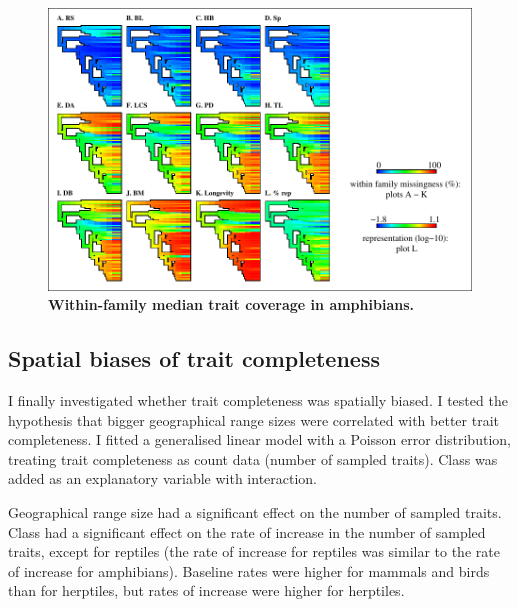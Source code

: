 \begin{figure}[h!]
\centering
\includegraphics[scale=1]{figures/chapter2/NA_phylo_patterns/Amphibians_coverage}
\caption[Within-family median trait coverage in amphibians]{\textbf{Within-family median trait coverage in amphibians.}}
\label{familycov_amphibians}
\end{figure}

\pagebreak


\subsection{Spatial biases of trait completeness} 
I finally investigated whether trait completeness was spatially biased. I tested the hypothesis that bigger geographical range sizes were correlated with better trait completeness. I fitted a generalised linear model with a Poisson error distribution, treating trait completeness as count data (number of sampled traits). Class was added as an explanatory variable with interaction. 

Geographical range size had a significant effect on the number of sampled traits. Class had a significant effect on the rate of increase in the number of sampled traits, except for reptiles (the rate of increase for reptiles was similar to the rate of increase for amphibians). Baseline rates were higher for mammals and birds than for herptiles, but rates of increase were higher for herptiles.

